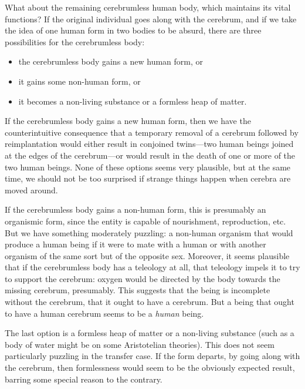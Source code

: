 What about the remaining cerebrumless human body, which maintains its vital functions? If the original individual goes along
with the cerebrum, and if we take the idea of one human form in two bodies to be absurd, there are three possibilities 
for the cerebrumless body:
\begin{itemize}
\item[(a)] the cerebrumless body gains a new human form, or 
\item[(b)] it gains some non-human form, or 
\item[(c)] it becomes a non-living substance or a formless heap of matter. 
\end{itemize}

If the cerebrumless body gains a new human form, then we have the counterintuitive consequence that a temporary removal
of a cerebrum followed by reimplantation would either result in conjoined twins---two human beings joined at the edges
of the cerebrum---or would result in the death of one or more of the two human beings. None of these options seems very
plausible, but at the same time, we should not be too surprised if strange things happen when cerebra are moved around.

If the cerebrumless body gains a non-human form, this is presumably an organismic form, since the entity is capable of
nourishment, reproduction, etc. But we have something moderately puzzling: a non-human organism
that would produce a human being if it were to mate with a human or with another organism of the same sort but of the
opposite sex. Moreover, it seems plausible that if the cerebrumless body has a teleology at all, that teleology impels
it to try to support the cerebrum: oxygen would be directed by the body towards the missing cerebrum, presumably. This
suggests that the being is incomplete without the cerebrum, that it ought to have a cerebrum. But a being that ought 
to have a human cerebrum seems to be a \textit{human} being. 

The last option is a formless heap of matter or a non-living substance (such as a body of water might be on some 
Aristotelian theories). This does not 
seem particularly puzzling in the transfer case. 
If the form departs, by going along with the cerebrum, then formlessness would seem to be the obviously expected result, 
barring some special reason to the contrary.

